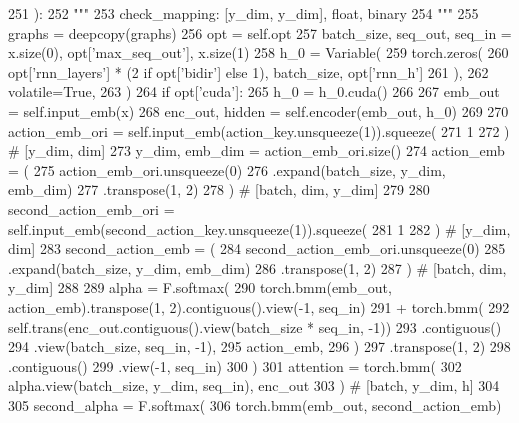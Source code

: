 \begin{DoxyCode}
251     ):
252         \textcolor{stringliteral}{"""}
253 \textcolor{stringliteral}{        check\_mapping: [y\_dim, y\_dim], float, binary}
254 \textcolor{stringliteral}{        """}
255         graphs = deepcopy(graphs)
256         opt = self.opt
257         batch\_size, seq\_out, seq\_in = x.size(0), opt[\textcolor{stringliteral}{'max\_seq\_out'}], x.size(1)
258         h\_0 = Variable(
259             torch.zeros(
260                 opt[\textcolor{stringliteral}{'rnn\_layers'}] * (2 \textcolor{keywordflow}{if} opt[\textcolor{stringliteral}{'bidir'}] \textcolor{keywordflow}{else} 1), batch\_size, opt[\textcolor{stringliteral}{'rnn\_h'}]
261             ),
262             volatile=\textcolor{keyword}{True},
263         )
264         \textcolor{keywordflow}{if} opt[\textcolor{stringliteral}{'cuda'}]:
265             h\_0 = h\_0.cuda()
266 
267         emb\_out = self.input\_emb(x)
268         enc\_out, hidden = self.encoder(emb\_out, h\_0)
269 
270         action\_emb\_ori = self.input\_emb(action\_key.unsqueeze(1)).squeeze(
271             1
272         )  \textcolor{comment}{# [y\_dim, dim]}
273         y\_dim, emb\_dim = action\_emb\_ori.size()
274         action\_emb = (
275             action\_emb\_ori.unsqueeze(0)
276             .expand(batch\_size, y\_dim, emb\_dim)
277             .transpose(1, 2)
278         )  \textcolor{comment}{# [batch, dim, y\_dim]}
279 
280         second\_action\_emb\_ori = self.input\_emb(second\_action\_key.unsqueeze(1)).squeeze(
281             1
282         )  \textcolor{comment}{# [y\_dim, dim]}
283         second\_action\_emb = (
284             second\_action\_emb\_ori.unsqueeze(0)
285             .expand(batch\_size, y\_dim, emb\_dim)
286             .transpose(1, 2)
287         )  \textcolor{comment}{# [batch, dim, y\_dim]}
288 
289         alpha = F.softmax(
290             torch.bmm(emb\_out, action\_emb).transpose(1, 2).contiguous().view(-1, seq\_in)
291             + torch.bmm(
292                 self.trans(enc\_out.contiguous().view(batch\_size * seq\_in, -1))
293                 .contiguous()
294                 .view(batch\_size, seq\_in, -1),
295                 action\_emb,
296             )
297             .transpose(1, 2)
298             .contiguous()
299             .view(-1, seq\_in)
300         )
301         attention = torch.bmm(
302             alpha.view(batch\_size, y\_dim, seq\_in), enc\_out
303         )  \textcolor{comment}{# [batch, y\_dim, h]}
304 
305         second\_alpha = F.softmax(
306             torch.bmm(emb\_out, second\_action\_emb)

\end{DoxyCode}
